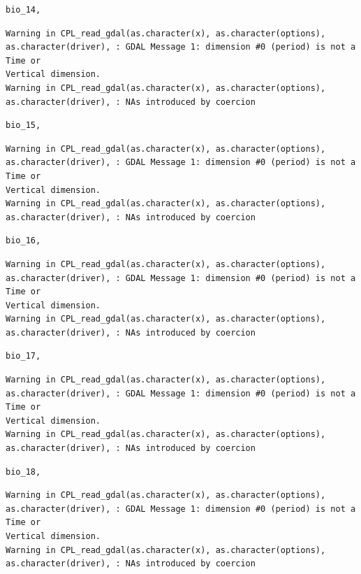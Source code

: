\documentclass[
  authoryear,
  preprint]{elsarticle}
\begin{document}
\begin{verbatim}
bio_14, 
\end{verbatim}

\begin{verbatim}
Warning in CPL_read_gdal(as.character(x), as.character(options),
as.character(driver), : GDAL Message 1: dimension #0 (period) is not a Time or
Vertical dimension.
Warning in CPL_read_gdal(as.character(x), as.character(options),
as.character(driver), : NAs introduced by coercion
\end{verbatim}

\begin{verbatim}
bio_15, 
\end{verbatim}

\begin{verbatim}
Warning in CPL_read_gdal(as.character(x), as.character(options),
as.character(driver), : GDAL Message 1: dimension #0 (period) is not a Time or
Vertical dimension.
Warning in CPL_read_gdal(as.character(x), as.character(options),
as.character(driver), : NAs introduced by coercion
\end{verbatim}

\begin{verbatim}
bio_16, 
\end{verbatim}

\begin{verbatim}
Warning in CPL_read_gdal(as.character(x), as.character(options),
as.character(driver), : GDAL Message 1: dimension #0 (period) is not a Time or
Vertical dimension.
Warning in CPL_read_gdal(as.character(x), as.character(options),
as.character(driver), : NAs introduced by coercion
\end{verbatim}

\begin{verbatim}
bio_17, 
\end{verbatim}

\begin{verbatim}
Warning in CPL_read_gdal(as.character(x), as.character(options),
as.character(driver), : GDAL Message 1: dimension #0 (period) is not a Time or
Vertical dimension.
Warning in CPL_read_gdal(as.character(x), as.character(options),
as.character(driver), : NAs introduced by coercion
\end{verbatim}

\begin{verbatim}
bio_18, 
\end{verbatim}

\begin{verbatim}
Warning in CPL_read_gdal(as.character(x), as.character(options),
as.character(driver), : GDAL Message 1: dimension #0 (period) is not a Time or
Vertical dimension.
Warning in CPL_read_gdal(as.character(x), as.character(options),
as.character(driver), : NAs introduced by coercion
\end{verbatim}
\end{document}
